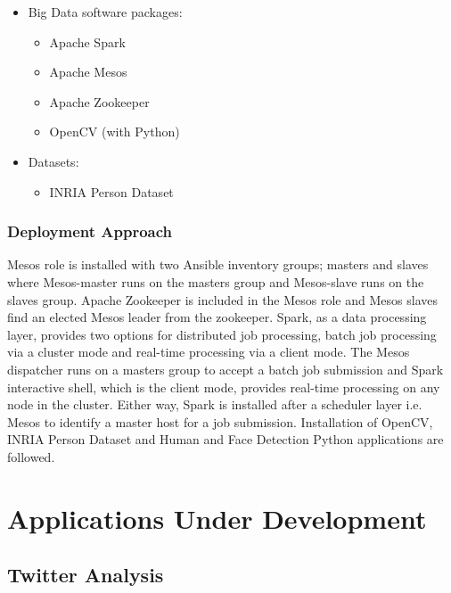 \documentclass[9pt,twocolumn,twoside]{styles/osajnl}
\begin{document}
\begin{itemize}

\item Big Data software packages:

\begin{itemize}
\item Apache Spark
\item Apache Mesos
\item Apache Zookeeper
\item OpenCV (with Python)
\end{itemize}

\item{Datasets:}


\begin{itemize}
\item INRIA Person Dataset
\end{itemize}

\end{itemize}

\subsubsection{Deployment Approach}

Mesos role is installed with two Ansible inventory groups; masters and
slaves where Mesos-master runs on the masters group and Mesos-slave
runs on the slaves group. Apache Zookeeper is included in the Mesos
role and Mesos slaves find an elected Mesos leader from the
zookeeper. Spark, as a data processing layer, provides two options for
distributed job processing, batch job processing via a cluster mode
and real-time processing via a client mode. The Mesos dispatcher runs
on a masters group to accept a batch job submission and Spark
interactive shell, which is the client mode, provides real-time
processing on any node in the cluster. Either way, Spark is installed
after a scheduler layer i.e. Mesos to identify a master host for a job
submission. Installation of OpenCV, INRIA Person Dataset and Human and
Face Detection Python applications are followed.


\section{Applications Under Development}

\subsection{Twitter Analysis}
\end{document}

